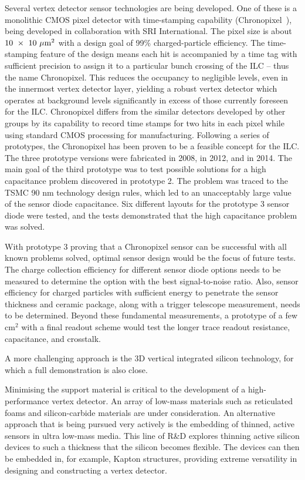 Several vertex detector sensor technologies are being developed.  One of these is a 
monolithic CMOS pixel detector with time-stamping capability (Chronopixel~\cite{Sinev:2015iwr}),
being developed in collaboration with SRI International. 
The pixel size is about  $10~\times~10~\mu\mathrm{m}^2$ with a design goal of 99\% charged-particle
 efficiency.
The time-stamping feature of the design means each hit is accompanied by a time tag with sufficient precision to assign it to a particular bunch crossing of
the ILC -- thus the name Chronopixel. This reduces the occupancy to negligible levels, even in the
innermost vertex detector layer, yielding a robust vertex detector which operates at background
levels significantly in excess of those currently foreseen for the ILC. Chronopixel differs from the
similar detectors developed by other groups by its capability to record time stamps for two hits in
each pixel while using standard CMOS processing for manufacturing. 
Following a series of prototypes, the Chronopixel has been proven to be
a feasible concept for the ILC. The three prototype versions
were fabricated in 2008, in 2012, and in 2014.
The main goal of the third prototype was to test possible solutions for a high capacitance problem
discovered in prototype 2. The problem was traced to the TSMC 90 nm technology design rules,
which led to an unacceptably large value of the sensor diode capacitance. Six different layouts
for the prototype 3 sensor diode were tested, and the tests demonstrated that the high capacitance
problem was solved.

With prototype 3 proving that a Chronopixel sensor can be successful with all known problems solved, optimal sensor design would be the focus of future tests.
The charge collection efficiency for different sensor diode options needs to be measured to determine
the option with the best signal-to-noise ratio. Also, sensor efficiency for charged particles with sufficient energy to penetrate the sensor thickness and ceramic package, along with a trigger telescope measurement, needs to be determined. Beyond these fundamental measurements, a prototype of a few cm$^2$ with a final readout scheme would
test the longer trace readout resistance, capacitance, and crosstalk.

A more challenging approach is the 3D vertical integrated silicon technology, for which a full 
demonstration is also close.




Minimising the support material is critical to the development of a high-performance 
vertex detector. An array of 
low-mass materials such as reticulated foams and silicon-carbide
materials are under consideration. An alternative approach that is being pursued very actively is the
embedding of thinned, active sensors in ultra low-mass media. This line of R\&D
explores thinning active silicon devices to such a thickness that the silicon
becomes flexible. The devices can then be embedded in, for example, Kapton
structures, providing extreme versatility in designing and constructing a vertex
detector.

